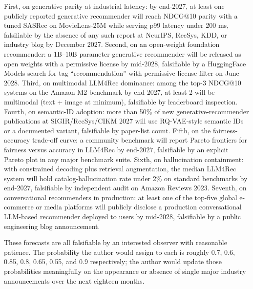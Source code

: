 \documentclass{article}
\begin{document}
First, on generative parity at industrial latency: by end-2027, at least one publicly reported generative recommender will reach NDCG@10 parity with a tuned SASRec on MovieLens-25M while serving p99 latency under 200 ms, falsifiable by the absence of any such report at NeurIPS, RecSys, KDD, or industry blog by December 2027. Second, on an open-weight foundation recommender: a 1B--10B parameter generative recommender will be released as open weights with a permissive license by mid-2028, falsifiable by a HuggingFace Models search for tag ``recommendation'' with permissive license filter on June 2028. Third, on multimodal LLM4Rec dominance: among the top-3 NDCG@10 systems on the Amazon-M2 benchmark by end-2027, at least 2 will be multimodal (text + image at minimum), falsifiable by leaderboard inspection. Fourth, on semantic-ID adoption: more than 50\% of new generative-recommender publications at SIGIR/RecSys/CIKM 2027 will use RQ-VAE-style semantic IDs or a documented variant, falsifiable by paper-list count. Fifth, on the fairness-accuracy trade-off curve: a community benchmark will report Pareto frontiers for fairness versus accuracy in LLM4Rec by end-2027, falsifiable by an explicit Pareto plot in any major benchmark suite. Sixth, on hallucination containment: with constrained decoding plus retrieval augmentation, the median LLM4Rec system will hold catalog-hallucination rate under 2\% on standard benchmarks by end-2027, falsifiable by independent audit on Amazon Reviews 2023. Seventh, on conversational recommenders in production: at least one of the top-five global e-commerce or media platforms will publicly disclose a production conversational LLM-based recommender deployed to users by mid-2028, falsifiable by a public engineering blog announcement.

These forecasts are all falsifiable by an interested observer with reasonable patience. The probability the author would assign to each is roughly 0.7, 0.6, 0.85, 0.8, 0.65, 0.55, and 0.9 respectively; the author would update those probabilities meaningfully on the appearance or absence of single major industry announcements over the next eighteen months.
\end{document}

